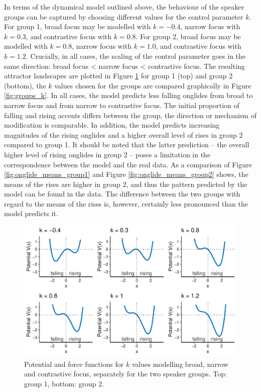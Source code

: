 In terms of the dynamical model outlined above, the behaviour of the speaker groups can be captured by choosing different values for the control parameter $k$. For group 1, broad focus may be modelled with $k = -0.4$, narrow focus with $k = 0.3$, and contrastive focus with $k = 0.8$. For group 2, broad focus may be modelled with $k = 0.8$, narrow focus with $k =  1.0$, and contrastive focus with $k = 1.2$. Crucially, in all cases, the scaling of the control parameter goes in the same direction: broad focus < narrow focus < contrastive focus. The resulting attractor landscapes are plotted in Figure \ref{fig:potentials_groups} for group 1 (top) and group 2 (bottom), the $k$ values chosen for the groups are compared graphically in Figure \ref{fig:groups_k}. In all cases, the model predicts less falling onglides from broad to narrow focus and from narrow to contrastive focus. The initial proportion of falling and rising accents differs between the group, the direction or mechanism of modification is comparable. In addition, the model predicts increasing magnitudes of the rising onglides and a higher overall level of rises in group 2 compared to group 1. It should be noted that the latter prediction -- the overall higher level of rising onglides in group 2 -- poses a limitation in the correspondence between the model and the real data. As a comparison of Figure \ref{fig:onglide_means_group1} and Figure \ref{fig:onglide_means_group2} shows, the means of the rises are higher in group 2, and thus the pattern predicted by the model can be found in the data. The difference between the two groups with regard to the means of the rises is, however, certainly less pronounced than the model predicts it.

\begin{figure}
\includegraphics[width=\textwidth]{figures/ch6/potentials_groups.pdf}
\caption[Potential and force functions for $k$ values modelling broad (left), narrow (centre) and contrastive focus (right), separately for the two speaker groups.]{Potential and force functions for $k$ values modelling broad, narrow and contrastive focus, separately for the two speaker groups. Top: group 1, bottom: group 2.}
\label{fig:potentials_groups}
\end{figure}

